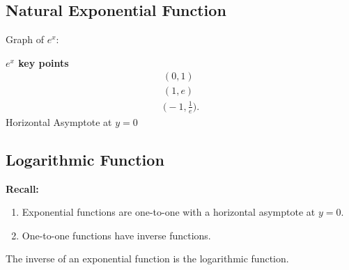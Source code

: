 \documentclass{report}
\begin{document}
      \pagebreak \bigbreak \noindent
      \subsection{Natural Exponential Function}
      \bigbreak \noindent 
      Graph of $e^{x}$:
      \begin{figure}[ht]
          \centering
          \label{fig:ex}
      \end{figure}
      \begin{mdframed}
        \textbf{$e^{x}$ key points}
        \bigbreak \noindent 
        \begin{align*}
          (0,1) \\
          (1,e) \\
         \bigg(-1, \frac{1}{e}\bigg)
        .\end{align*}
        \bigbreak \noindent 
        Horizontal Asymptote at $y=0$
        \bigbreak \noindent 
      \end{mdframed}

      \pagebreak \bigbreak \noindent
      \subsection{Logarithmic Function}
      \bigbreak \noindent 
      \begin{mdframed}
        \textbf{Recall:}
        \begin{enumerate}
          \item Exponential functions are one-to-one with a horizontal asymptote at $y = 0$.
          \item One-to-one functions have inverse functions.
        \end{enumerate}
        \bigbreak \noindent 
        The inverse of an exponential function is the logarithmic function.
      \end{mdframed}
\end{document}
